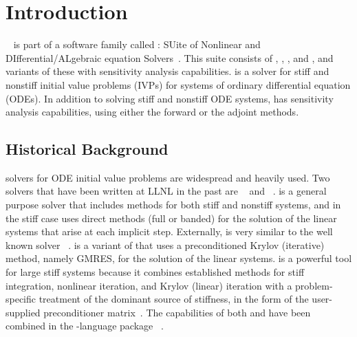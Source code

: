 \chapter{Introduction}\label{s:intro}

{\cvodes}~\cite{SeHi:05} is part of a software family called {\sundials}:
SUite of Nonlinear and DIfferential/ALgebraic equation Solvers~\cite{HBGLSSW:05}.
This suite consists of {\cvode}, {\arkode}, {\kinsol}, and {\ida}, and variants
of these with sensitivity analysis capabilities.
%
{\cvodes} is a solver for
stiff and nonstiff initial value problems (IVPs) for systems of
ordinary differential equation (ODEs). In addition to solving stiff
and nonstiff ODE systems, {\cvodes} has sensitivity analysis
capabilities, using either the forward or the adjoint methods.

\section{Historical Background}\label{ss:history}

{\F} solvers for ODE initial value problems are widespread and heavily used.
Two solvers that have been written at LLNL in the past are {\vode}~\cite{BBH:89}
and {\vodpk}~\cite{Byr:92}.
{\vode} is a general purpose solver that includes methods for
both stiff and nonstiff systems, and in the stiff case uses direct methods (full or
banded) for the solution of the linear systems that arise at each implicit
step. Externally, {\vode} is very similar to the well known solver
{\lsode}~\cite{RaHi:94}. {\vodpk}
is a variant of {\vode} that uses a preconditioned Krylov (iterative)
method, namely GMRES, for the solution of the linear systems. {\vodpk}
is a powerful tool for large stiff systems because it combines
established methods for stiff integration, nonlinear iteration, and
Krylov (linear) iteration with a problem-specific treatment of the
dominant source of stiffness, in the form of the user-supplied
preconditioner matrix~\cite{BrHi:89}.  The capabilities of both
{\vode} and {\vodpk} have been combined in the {\CC}-language package
{\cvode}~\cite{CoHi:96}.

